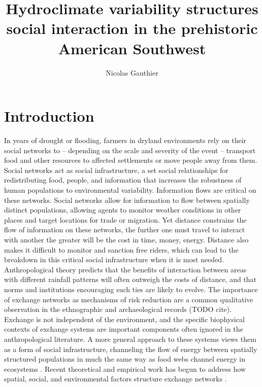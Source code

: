 \documentclass[fleqn,10pt]{wlscirep}
\title{Hydroclimate variability structures social interaction in the prehistoric American Southwest}
\author[1,*]{Nicolas Gauthier}
\affil[1]{School of Human Evolution and Social Change, 900 S Caddy Mall, Tempe, USA}
\affil[*]{Nicolas.Gauthier@asu.edu}
\begin{document}
\flushbottom
\maketitle


\thispagestyle{empty}


\section*{Introduction}
In years of drought or flooding, farmers in dryland environments rely on their social networks to -- depending on the scale and severity of the event -- transport food and other resources to affected settlements or move people away from them. Social networks act as social infrastructure, a set social relationships for redistributing food, people, and information that increases the robustness of human populations to environmental variability. Information flows are critical on these networks. Social networks allow for information to flow between spatially distinct populations, allowing agents to monitor weather conditions in other places and target locations for trade or migration. Yet distance constrains the flow of information on these networks, the further one must travel to interact with another the greater will be the cost in time, money, energy. Distance also makes it difficult to monitor and sanction free riders, which can lead to the breakdown in this critical social infrastructure when it is most needed. Anthropological theory predicts that the benefits of interaction between areas with different rainfall patterns will often outweigh the costs of distance, and that norms and institutions encouraging such ties are likely to evolve. The importance of exchange networks as mechanisms of risk reduction are a common qualitative observation in the ethnographic and archaeological records (TODO cite). %
Exchange is not independent of the environment, and the specific biophysical contexts of exchange systems are important components often ignored in the anthropological literature. A more general approach to these systems views them as a form of social infrastructure, channeling the flow of energy between spatially structured populations in much the same way as food webs channel energy in ecosystems \cite{Crabtree2015,Crabtree2017ReconstructingStates}. Recent theoretical and empirical work has begun to address how spatial, social, and environmental factors structure exchange networks \cite{Nolin2010Food-SharingIndonesia,Koster2014,Hao2015,Schnegg2015}.
\end{document}
